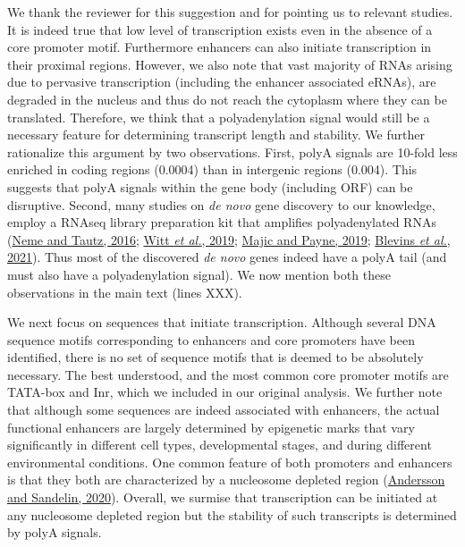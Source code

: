 \documentclass[12pt,a4paper]{article}
\begin{document}
We thank the reviewer for this suggestion and for pointing us to relevant studies. It is indeed true that low level of transcription exists even in the absence of a core promoter motif. Furthermore enhancers can also initiate transcription in their proximal regions. However, we also note that vast majority of RNAs arising due to pervasive transcription (including the enhancer associated eRNAs), are degraded in the nucleus and thus do not reach the cytoplasm where they can be translated. Therefore, we think that a polyadenylation signal would still be a necessary feature for determining transcript length and stability. We further rationalize this argument by two observations. First, polyA signals are 10-fold less enriched in coding regions (0.0004) than in intergenic regions (0.004). This suggests that polyA signals within the gene body (including ORF) can be disruptive. Second, many studies on \textit{de novo} gene discovery to our knowledge, employ a RNAseq library preparation kit that amplifies polyadenylated RNAs (\href{https://doi.org/10.7554/eLife.09977}{Neme and Tautz, 2016}; \href{https://doi.org/10.7554/eLife.47138}{Witt \textit{et al.}, 2019}; \href{https://doi.org/10.1093/molbev/msz300}{Majic and Payne, 2019}; \href{https://doi.org/10.1038/s41467-021-20911-3}{Blevins \textit{et al.}, 2021}). Thus most of the discovered \textit{de novo} genes indeed have a polyA tail (and must also have a polyadenylation signal). We now mention both these observations in the main text (lines XXX).

We next focus on sequences that initiate transcription. Although several DNA sequence motifs corresponding to enhancers and core promoters have been identified, there is no set of sequence motifs that is deemed to be absolutely necessary. The best understood, and the most common core promoter motifs are TATA-box and Inr, which we included in our original analysis. We further note that although some sequences are indeed associated with enhancers, the actual functional enhancers are largely determined by epigenetic marks that vary significantly in different cell types, developmental stages, and during different environmental conditions. One common feature of both promoters and enhancers is that they both are characterized by a nucleosome depleted region (\href{https://doi.org/10.1038/s41576-019-0173-8}{Andersson and Sandelin, 2020}). Overall, we surmise that transcription can be initiated at any nucleosome depleted region but the stability of such transcripts is determined by polyA signals. 
\end{document}
